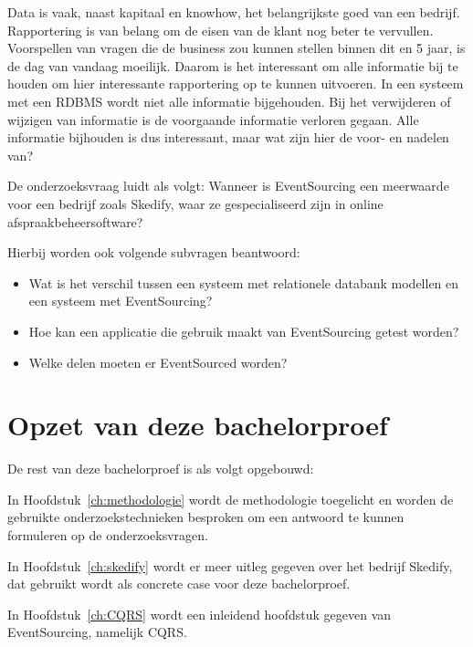 Data is vaak, naast kapitaal en knowhow, het belangrijkste goed van een bedrijf. Rapportering is van belang om de eisen van de klant nog beter te vervullen. Voorspellen van vragen die de business zou kunnen stellen binnen dit en 5 jaar, is de dag van vandaag moeilijk. Daarom is het interessant om alle informatie bij te houden om hier interessante rapportering op te kunnen uitvoeren. In een systeem met een \gls{RDBMS} wordt niet alle informatie bijgehouden. Bij het verwijderen of wijzigen van informatie is de voorgaande informatie verloren gegaan. Alle informatie bijhouden is dus interessant, maar wat zijn hier de voor- en nadelen van?

De onderzoeksvraag luidt als volgt: Wanneer is EventSourcing een meerwaarde voor een bedrijf zoals Skedify, waar ze gespecialiseerd zijn in online afspraakbeheersoftware?

Hierbij worden ook volgende subvragen beantwoord:

\begin{itemize}
    \item Wat is het verschil tussen een systeem met relationele databank modellen en een systeem met EventSourcing?
    \item Hoe kan een applicatie die gebruik maakt van EventSourcing getest worden?
    \item Welke delen moeten er EventSourced worden?
\end{itemize}

\section{Opzet van deze bachelorproef}
\label{sec:opzet-bachelorproef}


De rest van deze bachelorproef is als volgt opgebouwd:

In Hoofdstuk~\ref{ch:methodologie} wordt de methodologie toegelicht en worden de gebruikte onderzoekstechnieken besproken om een antwoord te kunnen formuleren op de onderzoeksvragen.

In Hoofdstuk~\ref{ch:skedify} wordt er meer uitleg gegeven over het bedrijf Skedify, dat gebruikt wordt als concrete case voor deze bachelorproef.

In Hoofdstuk~\ref{ch:CQRS} wordt een inleidend hoofdstuk gegeven van EventSourcing, namelijk \gls{CQRS}.

